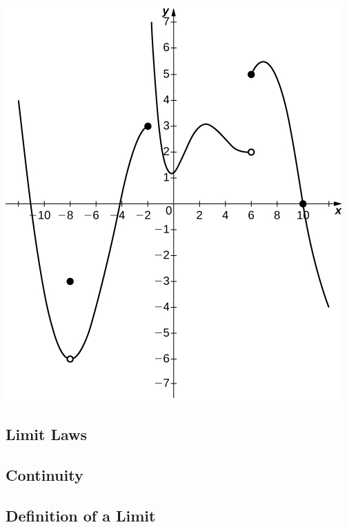 \begin{example}
\begin{center}
	\includegraphics[scale=1]{images/Figure 2.2.1.jpg}
\end{center}
\end{example}


\newpage 
\subsection{Limit Laws}

\newpage 
\subsection{Continuity}

\newpage 
\subsection{Definition of a Limit}